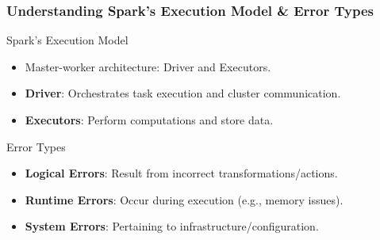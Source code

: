 \documentclass[aspectratio=169]{beamer}
\begin{document}
\begin{frame}[fragile]
    \frametitle{Understanding Spark's Execution Model \& Error Types}
    \begin{block}{Spark's Execution Model}
        \begin{itemize}
            \item Master-worker architecture: Driver and Executors.
            \item \textbf{Driver}: Orchestrates task execution and cluster communication.
            \item \textbf{Executors}: Perform computations and store data.
        \end{itemize}
    \end{block}
    
    \begin{block}{Error Types}
        \begin{itemize}
            \item \textbf{Logical Errors}: Result from incorrect transformations/actions.
            \item \textbf{Runtime Errors}: Occur during execution (e.g., memory issues).
            \item \textbf{System Errors}: Pertaining to infrastructure/configuration.
        \end{itemize}
    \end{block}
\end{frame}
\end{document}
